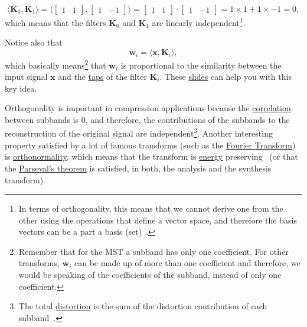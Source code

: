 \begin{equation}
  \langle {\mathbf K}_0,{\mathbf K}_1 \rangle =
  \langle \begin{bmatrix}
    1 & 1
  \end{bmatrix}
  ,
  \begin{bmatrix}
    1 & -1
  \end{bmatrix}
  \rangle =
  \begin{bmatrix}
    1 & 1
  \end{bmatrix}
  \cdot
  \begin{bmatrix}
    1 & -1
  \end{bmatrix}
   = 1\times 1 + 1\times -1 = 0,
\end{equation}
which means that the filters ${\mathbf K}_0$ and ${\mathbf K}_1$ are linearly
independent\footnote{In terms of orthogonality, this means that we
  cannot derive one from the other using the operations that define a
  vector space, and therefore the basis vectors can be a part a basis
  (set)~\cite{strang4linear}.}.

Notice also that
\begin{equation}
  {\mathbf w}_i = \langle {\mathbf x}, {\mathbf K}_i\rangle,
\end{equation}
which basically means\footnote{Remember that for the MST a subband has
  only one coefficient. For other transforms, ${\mathbf w}_i$ can be
  made up of more than one coefficient and therefore, we would be
  speaking of the coefficients of the subband, instead of only one
  coefficient.} that ${\mathbf w}_i$ is proportional to the similarity
between the input signal ${\mathbf x}$ and the
\href{https://en.wikipedia.org/wiki/Finite_impulse_response}{taps} of
the filter ${\mathbf K}_i$. These
\href{https://cseweb.ucsd.edu/classes/fa17/cse166-a/lec13.pdf}{slides}
can help you with this key idea.

Orthogonality is important in compression applications because the
\href{https://en.wikipedia.org/wiki/Correlation_and_dependence}{correlation}
between subbands is 0, and therefore, the contributions of the
subbands to the reconstruction of the original signal are
independent\footnote{The total
  \href{https://en.wikipedia.org/wiki/Distortion}{distortion} is the
  sum of the distortion contribution of each
  subband~\cite{sayood2017introduction}.}. Another interesting
property satisfied by a lot of famous transforms (such as the
\href{https://en.wikipedia.org/wiki/Fourier_transform}{Fourier
  Transform}) is
\href{https://en.wikipedia.org/wiki/Orthonormality}{orthonormality},
which means that the transform is
\href{https://en.wikipedia.org/wiki/Energy_(signal_processing)}{energy}
preserving~\cite{sayood2017introduction} (or that the
\href{https://en.wikipedia.org/wiki/Parseval%27s_theorem}{Parseval's theorem}
  is satisfied, in both, the analysis and the synthesis transform).

